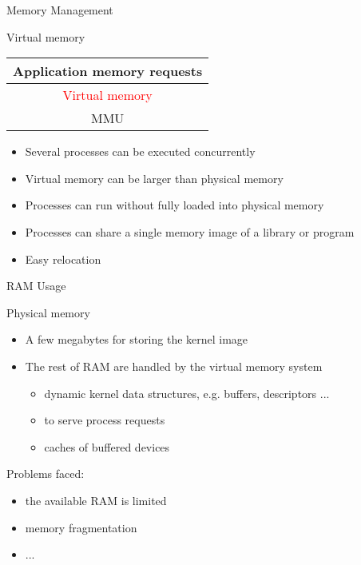 \begin{frame}{Memory Management}
  \begin{exampleblock}{Virtual memory}
    \begin{center}
      \begin{tabular}{|c|}\hline
        Application memory requests\\\hline
        \textcolor{red}{Virtual memory}\\\hline
        MMU\\\hline
      \end{tabular}
    \end{center}
    \begin{itemize}
    \item Several processes can be executed concurrently
    \item Virtual memory can be larger than physical memory
    \item Processes can run without fully loaded into physical memory
    \item Processes can share a single memory image of a library or program
    \item Easy relocation
    \end{itemize}
  \end{exampleblock}
\end{frame}

\begin{frame}{RAM Usage}
  \begin{exampleblock}{Physical memory}
    \begin{itemize}
    \item A few megabytes for storing the kernel image
    \item The rest of RAM are handled by the virtual memory system
      \begin{itemize}
      \item dynamic kernel data structures, e.g. buffers, descriptors ...
      \item to serve process requests
      \item caches of buffered devices
      \end{itemize}
    \end{itemize}
  \end{exampleblock}
  \begin{exampleblock}{Problems faced:}
    \begin{itemize}
    \item the available RAM is limited
    \item memory fragmentation
    \item ...
    \end{itemize}
  \end{exampleblock}
\end{frame}

